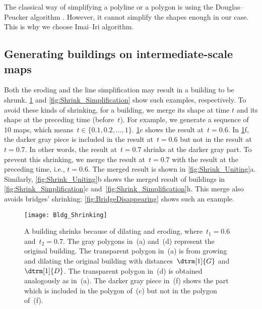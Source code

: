 The classical way of simplifying
a polyline or a polygon is using 
the Douglas--Peucker algorithm \citep{Douglas1973}. 
However, it cannot simplify the shapes enough in our case.
This is why we choose Imai--Iri algorithm.


%
%
%
%


\subsection{Generating buildings on intermediate-scale maps}
\label{sec:Unite}

Both the eroding and the line simplification 
may result in a building to be shrunk.
\fig\ref{fig:Shrink_Erosion} and 
\fig\ref{fig:Shrink_Simplification} show such 
examples, respectively.
To avoid these kinds of shrinking,
for a building, we merge its shape at time $t$ 
and its shape at the preceding time (before~$t$). 
For example, we generate a sequence of~$10$ maps,
which means~$t \in \{0.1, 0.2, \dots, 1\}$.
\fig\ref{fig:Shrink_Erosion}c shows the result at~$t=0.6$.
In \fig\ref{fig:Shrink_Erosion}f, 
the darker gray piece is included in the result at~$t=0.6$
but not in the result at~$t=0.7$.
In other words, the result at~$t=0.7$ 
shrinks at the darker gray part.
To prevent this shrinking, 
we merge the result at~$t=0.7$ with 
the result at the preceding time, i.e., $t=0.6$.
The merged result is shown in \fig\ref{fig:Shrink_Uniting}a.
Similarly, \fig\ref{fig:Shrink_Uniting}b shows the merged 
result of buildings 
in \fig\ref{fig:Shrink_Simplification}c 
and~\fig\ref{fig:Shrink_Simplification}h.
This merge also avoids bridges' shrinking;
\fig\ref{fig:BridgeDisappearing} shows such an example.

\begin{figure}[tb]
	\centering
	\texttt{[image: Bldg\_Shrinking]}
	\caption{A building shrinks because of dilating and eroding, 
		where~$t_1=0.6$ and~$t_2=0.7$.
		The gray polygons in~(a) and~(d) 
		represent the original building.
		The transparent polygon in~(a) is from 
		growing and dilating the original building with 
		distances~$\dtrm[1]{G}$ and~$\dtrm[1]{D}$.
		The transparent polygon in~(d) is obtained analogously
		as in~(a).
		The darker gray piece in~(f) shows 
		the part which is included in the polygon of~(c) 
		but not in the polygon of~(f).
	}
	\label{fig:Shrink_Erosion}
\end{figure}


